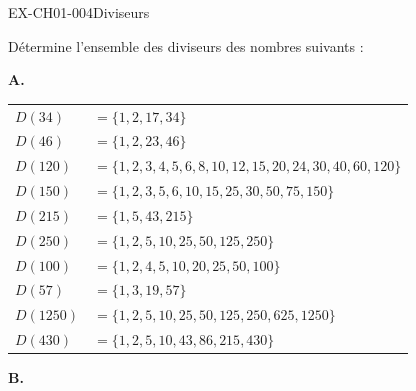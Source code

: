 
\begin{exercice}{EX-CH01-004}{Diviseurs}

Détermine l'ensemble des diviseurs des nombres suivants :
\bigskip

\textbf{A.}

\medskip
{}%
{\def\arraystretch{1.2}
\begin{tabularx}{\linewidth}{lX}
$D(34)$   & $= \{1, 2, 17, 34\}$ \\
$D(46)$   & $= \{1, 2, 23, 46\}$ \\
$D(120)$  & $= \{1, 2, 3, 4, 5, 6, 8, 10, 12, 15, 20, 24, 30, 40, 60, 120\}$ \\
$D(150)$  & $= \{1, 2, 3, 5, 6, 10, 15, 25, 30, 50, 75, 150\}$ \\
$D(215)$  & $= \{1, 5, 43, 215\}$ \\
$D(250)$  & $= \{1, 2, 5, 10, 25, 50, 125, 250\}$ \\
$D(100)$  & $= \{1, 2, 4, 5, 10, 20, 25, 50, 100\}$ \\
$D(57)$   & $= \{1, 3, 19, 57\}$ \\
$D(1250)$ & $= \{1, 2, 5, 10, 25, 50, 125, 250, 625, 1250\}$ \\
$D(430)$  & $= \{1, 2, 5, 10, 43, 86, 215, 430\}$ \\
\end{tabularx}
\def\arraystretch{1}}

\vspace{20pt}

\textbf{B.}


\end{exercice}
